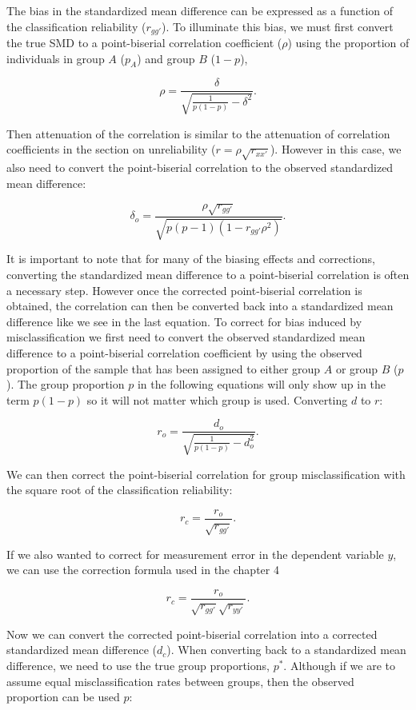 \documentclass[
  letterpaper,
  DIV=11,
  numbers=noendperiod]{scrreprt}
\begin{document}
The bias in the standardized mean difference can be expressed as a
function of the classification reliability (\(r_{gg'}\)). To illuminate
this bias, we must first convert the true SMD to a point-biserial
correlation coefficient (\(\rho\)) using the proportion of individuals
in group \(A\) (\(p_A\)) and group \(B\) (\(1-p\)),

\[
\rho = \frac{\delta}{\sqrt{\frac{1}{p(1-p)}-\delta^2}}.
\]

Then attenuation of the correlation is similar to the attenuation of
correlation coefficients in the section on unreliability
(\(r = \rho\sqrt{r_{xx'}}\)). However in this case, we also need to
convert the point-biserial correlation to the observed standardized mean
difference:

\[
\delta_o =\frac{ \rho \sqrt{r_{gg'}} }{\sqrt{p (p-1)\left(1- r_{gg'} \rho^2\right) }}.
\]

It is important to note that for many of the biasing effects and
corrections, converting the standardized mean difference to a
point-biserial correlation is often a necessary step. However once the
corrected point-biserial correlation is obtained, the correlation can
then be converted back into a standardized mean difference like we see
in the last equation. To correct for bias induced by misclassification
we first need to convert the observed standardized mean difference to a
point-biserial correlation coefficient by using the observed proportion
of the sample that has been assigned to either group \(A\) or group
\(B\) (\(p\)). The group proportion \(p\) in the following equations
will only show up in the term \(p(1-p)\) so it will not matter which
group is used. Converting \(d\) to \(r\):

\[
r_o = \frac{d_o}{\sqrt{\frac{1}{p(1-p)}-d_o^2}}.
\]

We can then correct the point-biserial correlation for group
misclassification with the square root of the classification
reliability:

\[
r_c = \frac{r_o}{\sqrt{r_{gg'}}}.
\]

If we also wanted to correct for measurement error in the dependent
variable \(y\), we can use the correction formula used in the chapter 4

\[
r_c = \frac{r_o}{\sqrt{r_{gg'}}\sqrt{r_{yy'}}}.
\]

Now we can convert the corrected point-biserial correlation into a
corrected standardized mean difference (\(d_c\)). When converting back
to a standardized mean difference, we need to use the true group
proportions, \(p^*\). Although if we are to assume equal
misclassification rates between groups, then the observed proportion can
be used \(p\):
\end{document}
